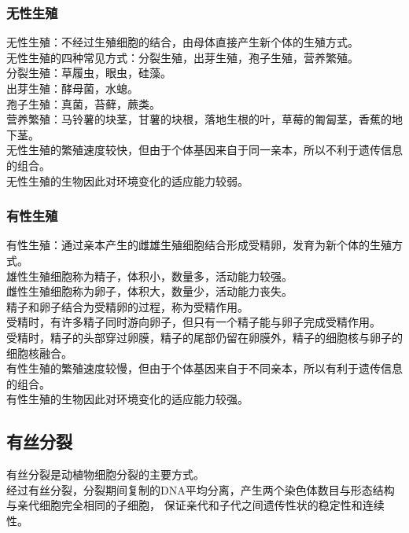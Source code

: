 \documentclass[UTF8]{ctexart}
\begin{document}
\subsubsection{无性生殖}
    无性生殖：不经过生殖细胞的结合，由母体直接产生新个体的生殖方式。\\[3mm]
    无性生殖的四种常见方式：分裂生殖，出芽生殖，孢子生殖，营养繁殖。\\[3mm]
    分裂生殖：草履虫，眼虫，硅藻。\\[2mm]
    出芽生殖：酵母菌，水螅。\\[2mm]
    孢子生殖：真菌，苔藓，蕨类。\\[2mm]
    营养繁殖：马铃薯的块茎，甘薯的块根，落地生根的叶，草莓的匍匐茎，香蕉的地下茎。\\[5mm]
    无性生殖的繁殖速度较快，但由于个体基因来自于同一亲本，所以不利于遗传信息的组合。\\[3mm]
    无性生殖的生物因此对环境变化的适应能力较弱。

\subsubsection{有性生殖}
    有性生殖：通过亲本产生的雌雄生殖细胞结合形成受精卵，发育为新个体的生殖方式。\\[3mm]
    雄性生殖细胞称为精子，体积小，数量多，活动能力较强。\\[3mm]
    雌性生殖细胞称为卵子，体积大，数量少，活动能力丧失。\\[5mm]
    精子和卵子结合为受精卵的过程，称为受精作用。\\[3mm]
    受精时，有许多精子同时游向卵子，但只有一个精子能与卵子完成受精作用。\\[3mm]
    受精时，精子的头部穿过卵膜，精子的尾部仍留在卵膜外，精子的细胞核与卵子的细胞核融合。\\[5mm]
    有性生殖的繁殖速度较慢，但由于个体基因来自于不同亲本，所以有利于遗传信息的组合。\\[3mm]
    有性生殖的生物因此对环境变化的适应能力较强。

\subsection{有丝分裂}
    有丝分裂是动植物细胞分裂的主要方式。\\[3mm]
    经过有丝分裂，分裂期间复制的DNA平均分离，产生两个染色体数目与形态结构与亲代细胞完全相同的子细胞，
    保证亲代和子代之间遗传性状的稳定性和连续性。

\newpage
\end{document}
